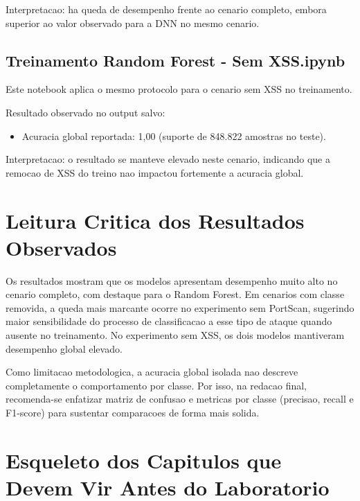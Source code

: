 Interpretacao: ha queda de desempenho frente ao cenario completo, embora superior ao valor observado para a DNN no mesmo cenario.


\subsection{Treinamento Random Forest - Sem XSS.ipynb}

Este notebook aplica o mesmo protocolo para o cenario sem XSS no treinamento.

Resultado observado no output salvo:
\begin{itemize}
\item Acuracia global reportada: 1,00 (suporte de 848.822 amostras no teste).
\end{itemize}

Interpretacao: o resultado se manteve elevado neste cenario, indicando que a remocao de XSS do treino nao impactou fortemente a acuracia global.


\section{Leitura Critica dos Resultados Observados}

Os resultados mostram que os modelos apresentam desempenho muito alto no cenario completo, com destaque para o Random Forest. Em cenarios com classe removida, a queda mais marcante ocorre no experimento sem PortScan, sugerindo maior sensibilidade do processo de classificacao a esse tipo de ataque quando ausente no treinamento. No experimento sem XSS, os dois modelos mantiveram desempenho global elevado.

Como limitacao metodologica, a acuracia global isolada nao descreve completamente o comportamento por classe. Por isso, na redacao final, recomenda-se enfatizar matriz de confusao e metricas por classe (precisao, recall e F1-score) para sustentar comparacoes de forma mais solida.


\section{Esqueleto dos Capitulos que Devem Vir Antes do Laboratorio}

